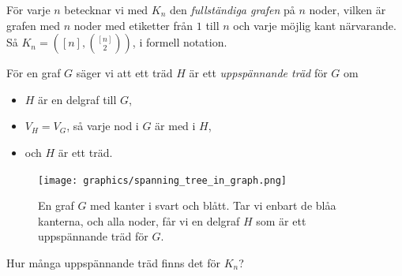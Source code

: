 \documentclass[nobib]{tufte-handout}
\begin{document}
\begin{xca}
    För varje $n$ betecknar vi med $K_n$ den \emph{fullständiga grafen} på $n$ noder, vilken är grafen med $n$ noder med etiketter från $1$ till $n$ och varje möjlig kant närvarande. Så $K_n = \left([n],\binom{[n]}{2}\right)$, i formell notation.

    För en graf $G$ säger vi att ett träd $H$ är ett \emph{uppspännande träd} för $G$ om
    \begin{itemize}
        \item $H$ är en delgraf till $G$,
        \item $V_H = V_G$, så varje nod i $G$ är med i $H$,
        \item och $H$ är ett träd.
    \end{itemize}
    
    \begin{figure}
        \centering
        \texttt{[image: graphics/spanning\_tree\_in\_graph.png]}
        \caption{En graf $G$ med kanter i svart och blått. Tar vi enbart de blåa kanterna, och alla noder, får vi en delgraf $H$ som är ett uppspännande träd för $G$.}
    \end{figure}

    Hur många uppspännande träd finns det för $K_n$?
\end{xca}
\end{document}
